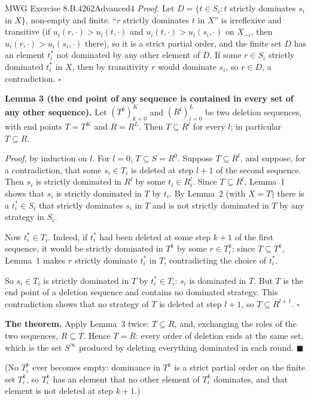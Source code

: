 \begin{exsol}{MWG Exercise 8.B.4}{262}{Advanced}{4}
\emph{Proof.} Let $D = \{t \in S_i : t$ strictly dominates $s_i$ in $X\}$, non-empty and finite.
``$r$ strictly dominates $t$ in $X$'' is irreflexive and transitive (if
$u_i(r,\cdot) > u_i(t,\cdot)$ and $u_i(t,\cdot) > u_i(s_i,\cdot)$ on $X_{-i}$, then
$u_i(r,\cdot) > u_i(s_i,\cdot)$ there), so it is a strict partial order, and the finite set $D$ has
an element $t_i^*$ not dominated by any other element of $D$. If some $r \in S_i$ strictly
dominated $t_i^*$ in $X$, then by transitivity $r$ would dominate $s_i$, so $r \in D$, a
contradiction. $\square$

\textbf{Lemma 3 (the end point of any sequence is contained in every set of any other
sequence).} Let $(T^k)_{k=0}^K$ and $(R^l)_{l=0}^L$ be two deletion sequences, with end points
$T = T^K$ and $R = R^L$. Then $T \subseteq R^l$ for every $l$; in particular $T \subseteq R$.

\emph{Proof}, by induction on $l$. For $l = 0$, $T \subseteq S = R^0$. Suppose $T \subseteq R^l$,
and suppose, for a contradiction, that some $s_i \in T_i$ is deleted at step $l+1$ of the second
sequence. Then $s_i$ is strictly dominated in $R^l$ by some $t_i \in R^l_i$. Since
$T \subseteq R^l$, Lemma~1 shows that $s_i$ is strictly dominated in $T$ by $t_i$. By Lemma~2
(with $X = T$) there is a $t_i^* \in S_i$ that strictly dominates $s_i$ in $T$ and is not strictly
dominated in $T$ by any strategy in $S_i$.

Now $t_i^* \in T_i$. Indeed, if $t_i^*$ had been deleted at some step $k+1$ of the first
sequence, it would be strictly dominated in $T^k$ by some $r \in T^k_i$; since $T \subseteq T^k$,
Lemma~1 makes $r$ strictly dominate $t_i^*$ in $T$, contradicting the choice of $t_i^*$.

So $s_i \in T_i$ is strictly dominated in $T$ by $t_i^* \in T_i$: $s_i$ is dominated in $T$. But
$T$ is the end point of a deletion sequence and contains no dominated strategy. This contradiction
shows that no strategy of $T$ is deleted at step $l+1$, so $T \subseteq R^{l+1}$. $\square$

\textbf{The theorem.} Apply Lemma~3 twice: $T \subseteq R$, and, exchanging the roles of the two
sequences, $R \subseteq T$. Hence $T = R$: every order of deletion ends at the same set, which is
the set $S^\infty$ produced by deleting everything dominated in each round. $\blacksquare$

(No $T^k_i$ ever becomes empty: dominance in $T^k$ is a strict partial order on the finite set
$T^k_i$, so $T^k_i$ has an element that no other element of $T^k_i$ dominates, and that element is
not deleted at step $k+1$.)


\end{exsol}
